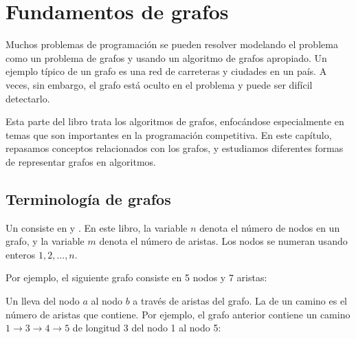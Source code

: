 \chapter{Fundamentos de grafos}

Muchos problemas de programación se pueden resolver
modelando el problema como un problema de grafos
y usando un algoritmo de grafos apropiado.
Un ejemplo típico de un grafo es una red
de carreteras y ciudades en un país.
A veces, sin embargo, el grafo está oculto
en el problema y puede ser difícil detectarlo.

Esta parte del libro trata los algoritmos de grafos,
enfocándose especialmente en temas que
son importantes en la programación competitiva.
En este capítulo, repasamos conceptos
relacionados con los grafos,
y estudiamos diferentes formas de representar grafos en algoritmos.

\section{Terminología de grafos}


Un  consiste en 
y . En este libro,
la variable $n$ denota el número de nodos
en un grafo, y la variable $m$ denota
el número de aristas.
Los nodos se numeran
usando enteros $1,2,\ldots,n$.

Por ejemplo, el siguiente grafo consiste en 5 nodos y 7 aristas:

\begin{center}
\end{center}


Un  lleva del nodo $a$ al nodo $b$
a través de aristas del grafo.
La  de un camino es el número de
aristas que contiene.
Por ejemplo, el grafo anterior contiene
un camino $1 \rightarrow 3 \rightarrow 4 \rightarrow 5$
de longitud 3
del nodo 1 al nodo 5:

